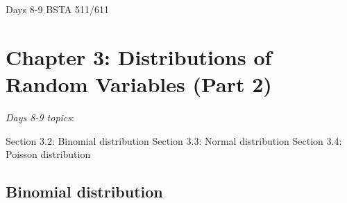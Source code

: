 \documentclass[12pt]{amsart}
\newtheorem{example}[theorem]{Example}
\begin{document}
\setcounter{section}{3}
\setcounter{subsection}{1}
Days 8-9 BSTA 511/611
{\huge  
\section*{Chapter 3: Distributions of Random Variables (Part 2)}
}



{\large 

\emph{Days 8-9 topics}:

Section 3.2: Binomial distribution  \newline
Section 3.3: Normal distribution  \newline
Section 3.4: Poisson distribution

\hrulefill

%
%
%
%
%
%






\subsection{Binomial distribution}

}
\end{document}
